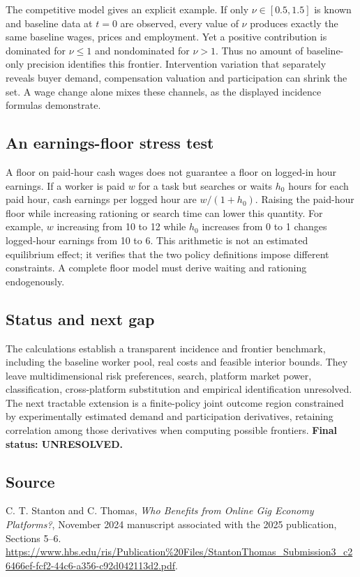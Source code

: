 \documentclass[11pt]{article}
\begin{document}
The competitive model gives an explicit example. If only $\nu\in[0.5,1.5]$
is known and baseline data at $t=0$ are observed, every value of $\nu$
produces exactly the same baseline wages, prices and employment. Yet a
positive contribution is dominated for $\nu\leq1$ and nondominated for
$\nu>1$. Thus no amount of baseline-only precision identifies this frontier.
Intervention variation that separately reveals buyer demand, compensation
valuation and participation can shrink the set. A wage change alone mixes
these channels, as the displayed incidence formulas demonstrate.

\subsection*{An earnings-floor stress test}
A floor on paid-hour cash wages does not guarantee a floor on logged-in
hour earnings. If a worker is paid $w$ for a task but searches or waits
$h_0$ hours for each paid hour, cash earnings per logged hour are
$w/(1+h_0)$. Raising the paid-hour floor while increasing rationing or
search time can lower this quantity. For example, $w$ increasing from
10 to 12 while $h_0$ increases from 0 to 1 changes logged-hour earnings
from 10 to 6. This arithmetic is not an estimated equilibrium effect;
it verifies that the two policy definitions impose different constraints.
A complete floor model must derive waiting and rationing endogenously.

\subsection*{Status and next gap}
The calculations establish a transparent incidence and frontier benchmark,
including the baseline worker pool, real costs and feasible interior
bounds. They leave multidimensional risk preferences, search, platform
market power, classification, cross-platform substitution and empirical
identification unresolved. The next tractable extension is a finite-policy
joint outcome region constrained by experimentally estimated demand and
participation derivatives, retaining correlation among those derivatives
when computing possible frontiers. \textbf{Final status: UNRESOLVED.}

\subsection*{Source}
C. T. Stanton and C. Thomas, \emph{Who Benefits from Online Gig Economy
Platforms?}, November 2024 manuscript associated with the 2025 publication,
Sections 5--6.
\url{https://www.hbs.edu/ris/Publication%20Files/StantonThomas_Submission3_c26466ef-fcf2-44c6-a356-c92d042113d2.pdf}.
\end{document}
